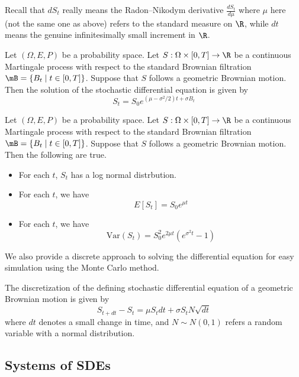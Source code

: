\documentclass[a4paper]{article}
\begin{document}
Recall that $dS_t$ really means the Radon–Nikodym derivative $\frac{dS_t}{d\mu}$ where $\mu$ here (not the same one as above) refers to the standard measure on $\R$, while $dt$ means the genuine infinitesimally small increment in $\R$. 

\begin{lmm}{}{} Let $(\Omega,E,P)$ be a probability space. Let $S:\Omega\times[0,T]\to\R$ be a continuous Martingale process with respect to the standard Brownian filtration $\mB=\{B_t\;|\;t\in[0,T]\}$. Suppose that $S$ follows a geometric Brownian motion. Then the solution of the stochastic differential equation is given by $$S_t=S_0e^{(\mu-\sigma^2/2)t+\sigma B_t}$$
\end{lmm}

\begin{prp}{}{} Let $(\Omega,E,P)$ be a probability space. Let $S:\Omega\times[0,T]\to\R$ be a continuous Martingale process with respect to the standard Brownian filtration $\mB=\{B_t\;|\;t\in[0,T]\}$. Suppose that $S$ follows a geometric Brownian motion. Then the following are true. 
\begin{itemize}
\item For each $t$, $S_t$ has a log normal distrbution. 
\item For each $t$, we have $$E[S_t]=S_0e^{\mu t}$$
\item For each $t$, we have $$\text{Var}(S_t)=S_0^2e^{2\mu t}(e^{\sigma^2 t}-1)$$
\end{itemize}
\end{prp}

We also provide a discrete approach to solving the differential equation for easy simulation using the Monte Carlo method. 

\begin{prp}{}{} The discretization of the defining stochastic differential equation of a geometric Brownian motion is given by $$S_{t+dt}-S_t=\mu S_tdt+\sigma S_tN\sqrt{dt}$$ where $dt$ denotes a small change in time, and $N\sim N(0,1)$ refers a random variable with a normal distribution. 
\end{prp}

\subsection{Systems of SDEs}
\end{document}
